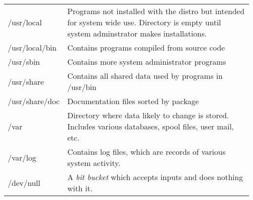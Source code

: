 \documentclass[12pt]{article}
\begin{document}
\begin{tabular}{| l | p{4in} |}
	/usr/local & Programs not installed with the distro but intended for system wide use. Directory is empty until system adminstrator makes installations.\\
	/usr/local/bin & Contains programs compiled from source code\\
	/usr/sbin & Contains more system administrator programs\\
	/usr/share & Contains all shared data used by programs in /usr/bin\\
	/usr/share/doc & Documentation files sorted by package\\
	/var & Directory where data likely to change is stored. Includes various databases, spool files, user mail, etc.\\
	/var/log & Contains log files, which are records of various system activity.\\
	/dev/null & A \textit{bit bucket} which accepts inputs and does nothing with it.\\
	\hline

\end{tabular}
\end{document}
